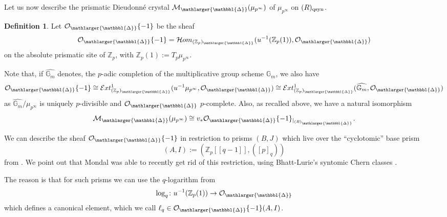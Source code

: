 \documentclass{amsart}
\newcommand{\prism}{{\mathlarger{\mathbbl{\Delta}}}}
\theoremstyle{plain}
\theoremstyle{definition}
\newtheorem{definition}[theorem]{Definition}
\newcommand{\Gm}{{\mathbb{G}_m}}
\newcommand{\Z}{\mathbb{Z}}
\newcommand{\red}[1]{{\color{black} #1}}
\begin{document}
\red{Let us now describe the prismatic Dieudonn\'e crystal $\mathcal{M}_{\prism}(\mu_{p^{\infty}})$ of $\mu_{p^\infty}$ on $(R)_{\rm qsyn}$. 

\begin{definition}
\label{definition-negative-breuil-kisin-tate-twist}
Let $\mathcal{O}_{\prism}\{-1 \}$ be the sheaf
$$
\mathcal{O}_{\prism}\{-1 \} = \mathcal{H}om_{(\Z_p)_{\prism}}(u^{-1}(\Z_p(1)),\mathcal{O}_\prism)
$$
on the absolute prismatic site of $\Z_p$, with $\Z_p(1):=T_p\mu_{p^\infty}$. 
\end{definition}

Note that, if $\widehat{\Gm}$ denotes, the $p$-adic completion of the multiplicative group scheme $\Gm$, we also have
$$
\mathcal{O}_{\prism} \{-1 \} \cong \mathcal{E}xt_{(\Z_p)_{\prism}}^{1}(u^{-1} \mu_{p^{\infty}},\mathcal{O}_{\prism}) \cong \mathcal{E}xt_{(\Z_p)_{\prism}}^{1}(\widehat{\Gm},\mathcal{O}_{\prism})
$$
as $\widehat{\Gm}/\mu_{p^\infty}$ is uniquely $p$-divisible and $\mathcal{O}_{\prism}$ $p$-complete. Also, as recalled above, we have a natural isomorphism
$$
\mathcal{M}_{\prism}(\mu_{p^{\infty}}) \cong v_\ast \mathcal{O}_{\prism} \{-1 \}_{|_{(R)_{\prism}}}.
$$ 
} 




We can describe the sheaf $\mathcal{O}_{\prism} \{-1\}$ in restriction to prisms $(B,J)$ which live over the ``cyclotomic'' base prism
$$
(A,I):=(\Z_p[[q-1]],([p]_q))
$$
from . We point out that Mondal \cite{mondal2022computation} was able to recently get rid of this restriction, using Bhatt-Lurie's syntomic Chern classes \cite{bhatt2022absolute}.

The reason is that for such prisms we can use the $q$-logarithm from 
$$
\log_q\colon u^{-1}(\Z_p(1))\to \mathcal{O}_\prism
$$
which defines a canonical element, which we call $\ell_q \in \mathcal{O}_{\prism}\{-1\}(A,I)$.
\end{document}
